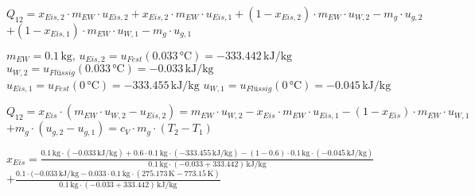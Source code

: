 \( Q_{12} = x_{Eis,2} \cdot m_{EW} \cdot u_{Eis,2} + x_{Eis,2} \cdot m_{EW} \cdot u_{Eis,1} + (1 - x_{Eis,2}) \cdot m_{EW} \cdot u_{W,2} - m_g \cdot u_{g,2} \)  
\( + (1 - x_{Eis,1}) \cdot m_{EW} \cdot u_{W,1} - m_g \cdot u_{g,1} \)  

\( m_{EW} = 0.1 \, \text{kg}, \, u_{Eis,2} = u_{Fest}(0.033 \, \text{°C}) = -333.442 \, \text{kJ/kg} \)  
\( u_{W,2} = u_{Flüssig}(0.033 \, \text{°C}) = -0.033 \, \text{kJ/kg} \)  
\( u_{Eis,1} = u_{Fest}(0 \, \text{°C}) = -333.455 \, \text{kJ/kg} \)  
\( u_{W,1} = u_{Flüssig}(0 \, \text{°C}) = -0.045 \, \text{kJ/kg} \)  

\( Q_{12} = x_{Eis} \cdot (m_{EW} \cdot u_{W,2} - u_{Eis,2}) = m_{EW} \cdot u_{W,2} - x_{Eis} \cdot m_{EW} \cdot u_{Eis,1} - (1 - x_{Eis}) \cdot m_{EW} \cdot u_{W,1} \)  
\( + m_g \cdot (u_{g,2} - u_{g,1}) = c_V \cdot m_g \cdot (T_2 - T_1) \)  

\( x_{Eis} = \frac{0.1 \, \text{kg} \cdot (-0.033 \, \text{kJ/kg}) + 0.6 \cdot 0.1 \, \text{kg} \cdot (-333.455 \, \text{kJ/kg}) - (1 - 0.6) \cdot 0.1 \, \text{kg} \cdot (-0.045 \, \text{kJ/kg})} {0.1 \, \text{kg} \cdot (-0.033 + 333.442) \, \text{kJ/kg}} \)  
\( + \frac{0.1 \cdot (-0.033 \, \text{kJ/kg} - 0.033 \cdot 0.1 \, \text{kg} \cdot (275.173 \, \text{K} - 773.15 \, \text{K})} {0.1 \, \text{kg} \cdot (-0.033 + 333.442) \, \text{kJ/kg}} \)